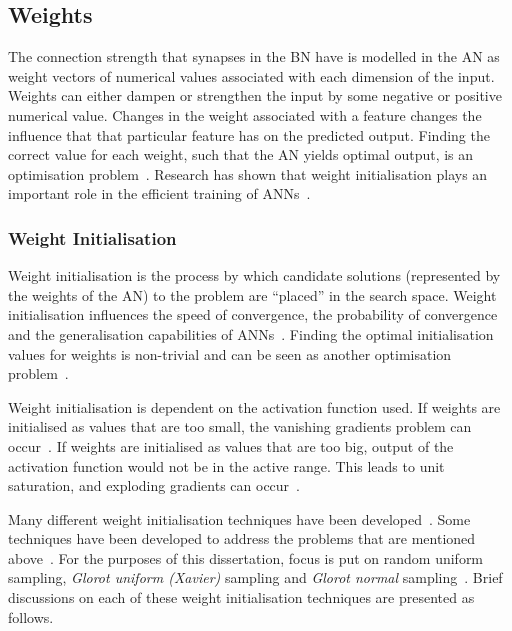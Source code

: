 \subsection{Weights}\label{sec:anns:an:weights}

The connection strength that synapses in the \acs{BN} have is modelled in the \acs{AN} as weight vectors of numerical values associated with each dimension of the input. Weights can either dampen or strengthen the input by some negative or positive numerical value. Changes in the weight associated with a feature changes the influence that that particular feature has on the predicted output. Finding the correct value for each weight, such that the \acs{AN} yields optimal output, is an optimisation problem~\cite{ref:thierens:1993}. Research has shown that weight initialisation plays an important role in the efficient training of \acp{ANN}~\cite{ref:thimm:1995}.

\subsubsection{Weight Initialisation}\label{sec:anns:an:weights:initialisation}

Weight initialisation is the process by which candidate solutions (represented by the weights of the \acs{AN}) to the problem are ``placed'' in the search space. Weight initialisation influences the speed of convergence, the probability of convergence and the generalisation capabilities of \acp{ANN}~\cite{ref:fernandez:2001}. Finding the optimal initialisation values for weights is non-trivial and can be seen as another optimisation problem~\cite{ref:de:2016, ref:erdogmus:2003, ref:yam:2000}.

Weight initialisation is dependent on the activation function used. If weights are initialised as values that are too small, the vanishing gradients problem can occur~\cite{ref:hanin:2018}. If weights are initialised as values that are too big, output of the activation function would not be in the active range. This leads to unit saturation, and exploding gradients can occur~\cite{ref:hanin:2018, ref:yadav:2018}.

Many different weight initialisation techniques have been developed~\cite{ref:erdogmus:2003}. Some techniques have been developed to address the problems that are mentioned above~\cite{ref:yadav:2018}. For the purposes of this dissertation, focus is put on random uniform sampling, \textit{Glorot uniform (Xavier)} sampling and \textit{Glorot normal} sampling~\cite{ref:glorot:2010}. Brief discussions on each of these weight initialisation techniques are presented as follows.


